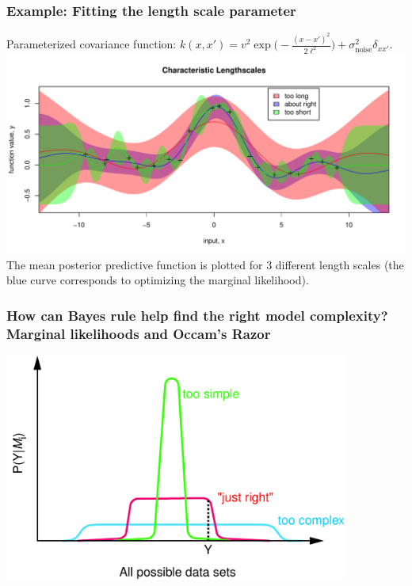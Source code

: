 \begin{frame}
\frametitle{Example: Fitting the length scale parameter}

Parameterized covariance function: $k(x,x') =
v^2\exp\big(-\displaystyle\frac{(x-x')^2}{2\ell^2}\big)
+\sigma_\mathrm{noise}^2\delta_{xx'}$.
\vskip-6mm
\includegraphics[width=\textwidth]{longshort2}
\vskip-4mm
The mean posterior predictive function is plotted for 3 different
length scales (the blue curve corresponds to optimizing the marginal
likelihood). 
\end{frame}


\begin{frame}
\frametitle{How can Bayes rule help find the right model complexity? 
  Marginal likelihoods and Occam's Razor}
\centerline{\includegraphics[width=0.85\textwidth]{ockham}}
\end{frame}


